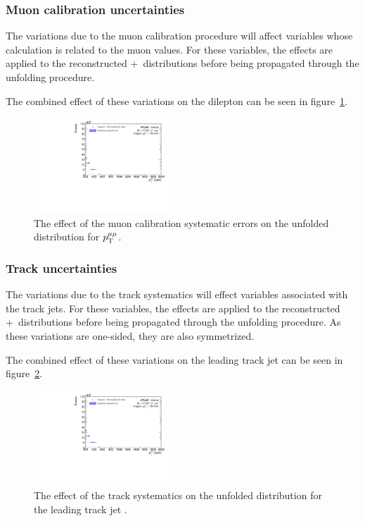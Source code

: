 \subsubsection{Muon calibration uncertainties}
The variations due to the muon calibration procedure will affect variables whose calculation is related to the muon \pt values. For these variables, the effects are applied to the reconstructed \powheg+\pythia~distributions before being propagated through the unfolding procedure.

The combined effect of these variations on the dilepton \pt can be seen in figure~\ref{fig:muCalSystErr}.

\begin{figure}[h!]
  \centering
  \includegraphics[page=28,width=0.45\textwidth]{figures/unfoldErrPlots.pdf}
  \caption{The effect of the muon calibration systematic errors on the unfolded distribution for $p_\mathrm{T}^{\mu\mu}$.}
  \label{fig:muCalSystErr}
\end{figure}

\subsubsection{Track uncertainties}
The variations due to the track systematics will effect variables associated with the track jets. For these variables, the effects are applied to the reconstructed \powheg+\pythia~distributions before being propagated through the unfolding procedure. As these variations are one-sided, they are also symmetrized.

The combined effect of these variations on the leading track jet \pt can be seen in figure~\ref{fig:trackSystErr}.

\begin{figure}[h!]
  \centering
  \includegraphics[page=300,width=0.45\textwidth]{figures/unfoldErrPlots.pdf}
  \caption{The effect of the track systematics on the unfolded distribution for the leading track jet \pt.}
  \label{fig:trackSystErr}
\end{figure}

